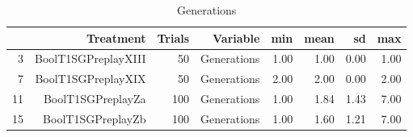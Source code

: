 \begin{table}[ht]
\centering
\begin{tabular}{rrrrrrrr}
  \hline
 & Treatment & Trials & Variable & min & mean & sd & max \\ 
  \hline
3 & BoolT1SGPreplayXIII &  50 & Generations & 1.00 & 1.00 & 0.00 & 1.00 \\ 
  7 & BoolT1SGPreplayXIX &  50 & Generations & 2.00 & 2.00 & 0.00 & 2.00 \\ 
  11 & BoolT1SGPreplayZa & 100 & Generations & 1.00 & 1.84 & 1.43 & 7.00 \\ 
  15 & BoolT1SGPreplayZb & 100 & Generations & 1.00 & 1.60 & 1.21 & 7.00 \\ 
   \hline
\end{tabular}
\caption{Generations} 
\end{table}

